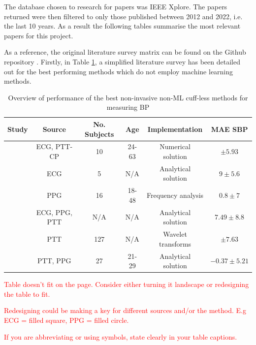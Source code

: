 The database chosen to research for papers was IEEE Xplore. The papers returned were then filtered 
to only those published between 2012 and 2022, i.e. the last 10 years. As a result the following tables summarise 
the most relevant papers for this project.



As a reference, the original literature survey matrix can be found on 
the Github repository \cite{LitSurvey}. Firstly, in 
Table \ref{litsurveytab}, a simplified literature survey has 
been detailed out for the best performing methods which do not 
employ machine learning methods. 
\begin{table}[H]
\caption{Overview of performance of the best non-invasive non-ML cuff-less methods for measuring BP}
\begin{tabular}{|c|c|c|c|c|c|}
\hline
\textbf{Study} & \textbf{Source} & \textbf{No. Subjects} & \textbf{Age} & \textbf{Implementation} & \textbf{MAE SBP} \\ \hline
\cite{Ahmad2012} & ECG, PTT-CP & 10 & 24-63 & Numerical solution & $\pm 5.93$ \\
\cite{Chen2013} & ECG & 5 & N/A & Analytical solution &  $9 \pm 5.6$\\
\cite{Daimiwal2014} & PPG & 16 & 18-48 & Frequency analysis &  $0.8 \pm  7$\\
\cite{Chan2001} & ECG, PPG, PTT & N/A & N/A & Analytical solution &  $7.49 \pm  8.8$\\
\cite{Yamanaka2016} & PTT & 127 & N/A & Wavelet transforms &  $\pm 7.63$\\
\cite{Ding2016} & PTT, PPG & 27 & 21-29 & Analytical solution &  $-0.37 \pm  5.21$\\ \hline
\end{tabular}
\label{litsurveytab}
\end{table}

\textcolor{red}{Table doesn't fit on the page. Consider either turning it landscape or redesigning the table to fit.}

\textcolor{red}{Redesigning could be making a key for different sources and/or the method. E.g ECG = filled square, PPG = filled circle.}

\textcolor{red}{If you are abbreviating or using symbols, state clearly in your table captions.}


